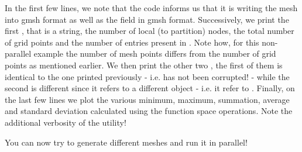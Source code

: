 %
In the first few lines, we note that the code informs us that it is 
writing the mesh into gmsh format as well as the field in gmsh format.
Successively, we print the first , that is a string, 
the number of local (to partition) nodes, the total number of grid 
points and the number of entries present in . 
Note how, for this non-parallel example the number of mesh points 
differs from the number of grid points as mentioned earlier. We 
then print the other two , the first of them is 
identical to the one printed previously - i.e.  
has not been corrupted! - while the second is different since it 
refers to a different object - i.e. it refer to .
Finally, on the last few lines we plot the various minimum, maximum, 
summation, average and standard deviation calculated using the 
function space operations.
Note the additional verbosity of the  \Atlas utility!

You can now try to generate different meshes and run it in parallel!




